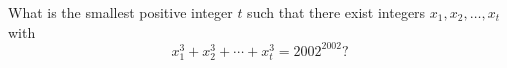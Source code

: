 What is the smallest positive integer $t$ such that there exist integers $x_1, x_2, \ldots, x_t$ with
\[ x_1^3 + x_2^3 + \cdots + x_t^3 = 2002^{2002}? \]
